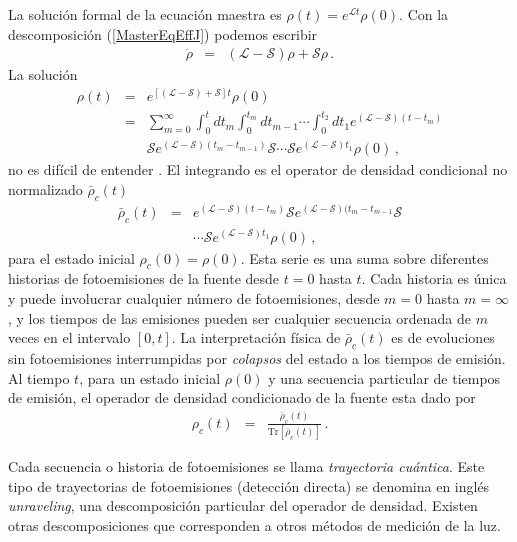 \documentclass[twocolumn,aps,eqsecnum,showkeys,amsmath]{revtex4}
\newcommand{\mcL}{\mathcal{L}}
\newcommand{\mcS}{\mathcal{S}}
\newcommand{\Tr}{\mathrm{Tr}}
\begin{document}
La soluci\'on formal  de la ecuaci\'on maestra es $\rho(t) = e^{\mcL t} \rho (0)$. 
Con la descomposici\'on (\ref{MasterEqEffJ}) podemos escribir 
%
\begin{eqnarray} 	%
\dot{\rho} &=& ( \mcL - \mcS ) \rho  +\mcS \rho \,. 		
\end{eqnarray}
La soluci\'on 
%
\begin{eqnarray} 	%
\rho (t) &=& e^{ [( \mcL - \mcS ) +\mcS ] t} \rho (0)  	\nonumber \\ 
&=& 	\sum_{m=0}^{\infty} \int_0^t dt_m  \int_0^{t_m} dt_{m-1}  \cdots 	
	 \int_0^{t_2} dt_1 e^{ (\mcL - \mcS) (t-t_m)}  		\nonumber \\ 
	&& \mcS e^{ (\mcL - \mcS) (t_m-t_{m-1})} \mcS \cdots 
	\mcS  e^{ (\mcL - \mcS) t_1} \rho(0) \,,
\end{eqnarray}
no es dif\'icil de entender \cite{Carmichael93}. El integrando es el 
operator de densidad condicional no normalizado  $\bar{\rho}_c (t)$ 
%
\begin{eqnarray} 	\label{eq:condDensOp}
\bar{\rho}_c (t) &=& e^{ (\mcL - \mcS) (t-t_m)} \mcS 	
	 e^{ (\mcL - \mcS) (t_m-t_{m-1}} \mcS 	\nonumber \\  
	&&\cdots \mcS  e^{ (\mcL - \mcS) t_1} \rho(0) \,,
\end{eqnarray}
para el estado inicial $\rho_c (0) = \rho (0)$. Esta serie es una suma sobre diferentes 
historias de fotoemisiones de la fuente desde $t=0$ hasta $t$. Cada historia es 
\'unica y puede involucrar cualquier n\'umero de fotoemisiones, desde $m=0$ hasta $m=\infty$, y los tiempos de las emisiones pueden ser cualquier secuencia ordenada 
de $m$ veces en el intervalo $[0,t]$.  La interpretaci\'on f\'isica de $\bar{\rho}_c (t)$ 
es de evoluciones sin fotoemisiones interrumpidas por \textit{colapsos} del estado a 
los tiempos de emisi\'on. Al tiempo $t$, para un estado inicial $\rho (0)$ y una 
secuencia particular de tiempos de emisi\'on, el operador de densidad condicionado 
de la fuente esta dado por 
%
\begin{eqnarray} 	\label{eq:condDensOp}
\rho_c (t) &=& \frac{\bar{\rho}_c (t) }{ \Tr [\bar{\rho}_c (t) ]} \,.
\end{eqnarray}

Cada secuencia o historia de fotoemisiones se llama \textit{trayectoria cu\'antica}. 
Este tipo de trayectorias de fotoemisiones (detecci\'on directa)  se denomina en 
ingl\'es \textit{unraveling}, una descomposici\'on particular del operador de densidad. 
Existen otras descomposiciones que corresponden a otros m\'etodos de medici\'on 
de la luz. 
\end{document}
